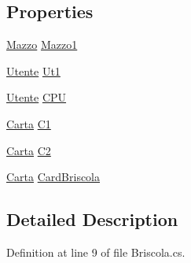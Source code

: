 \subsection*{Properties}
\begin{DoxyCompactItemize}
\item 
\hyperlink{class_conti_1_1_massimiliano_1_1__5_i_1_1_briscola_1_1_mazzo}{Mazzo} \hyperlink{class_conti_1_1_massimiliano_1_1__5_i_1_1_briscola_1_1_briscola_a334aaafc58c6124f82d422f76171d9ec}{Mazzo1}
\item 
\hyperlink{class_conti_1_1_massimiliano_1_1__5_i_1_1_briscola_1_1_utente}{Utente} \hyperlink{class_conti_1_1_massimiliano_1_1__5_i_1_1_briscola_1_1_briscola_ad64e3ae5d50884ca2a7392905305345d}{Ut1}
\item 
\hyperlink{class_conti_1_1_massimiliano_1_1__5_i_1_1_briscola_1_1_utente}{Utente} \hyperlink{class_conti_1_1_massimiliano_1_1__5_i_1_1_briscola_1_1_briscola_a0e39e5815ec32d3296ba743df21c5228}{C\+PU}
\item 
\hyperlink{class_conti_1_1_massimiliano_1_1__5_i_1_1_briscola_1_1_carta}{Carta} \hyperlink{class_conti_1_1_massimiliano_1_1__5_i_1_1_briscola_1_1_briscola_a2339bcf37d438392eaba00abc55a9412}{C1}
\item 
\hyperlink{class_conti_1_1_massimiliano_1_1__5_i_1_1_briscola_1_1_carta}{Carta} \hyperlink{class_conti_1_1_massimiliano_1_1__5_i_1_1_briscola_1_1_briscola_a028cf522d536002979f0aa9a89994e3b}{C2}
\item 
\hyperlink{class_conti_1_1_massimiliano_1_1__5_i_1_1_briscola_1_1_carta}{Carta} \hyperlink{class_conti_1_1_massimiliano_1_1__5_i_1_1_briscola_1_1_briscola_acc665c102dd48b4b45662bad2cd57015}{Card\+Briscola}
\end{DoxyCompactItemize}


\subsection{Detailed Description}


Definition at line 9 of file Briscola.\+cs.



